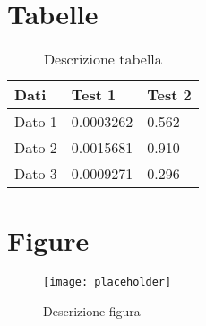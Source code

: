 \section{Tabelle}

\begin{table}[h]
\centering
\begin{tabular}{l l l}
\toprule
\textbf{Dati} & \textbf{Test 1} & \textbf{Test 2}\\
\midrule
Dato 1 & 0.0003262 & 0.562 \\
Dato 2 & 0.0015681 & 0.910 \\
Dato 3 & 0.0009271 & 0.296 \\
\bottomrule
\end{tabular}
\caption{Descrizione tabella}
\end{table}


\section{Figure}

\begin{figure}[h]
\centering\texttt{[image: placeholder]}
\caption{Descrizione figura}
\end{figure}